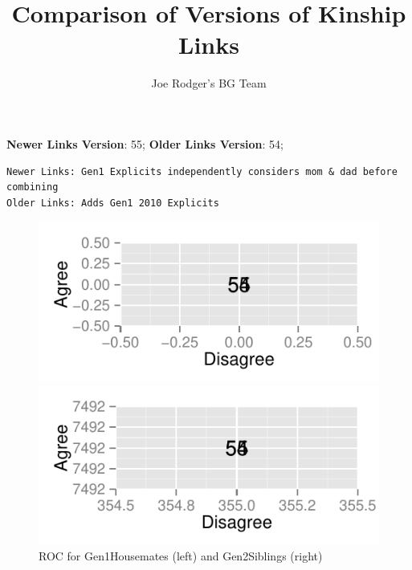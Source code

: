 \documentclass[a4paper]{article}\usepackage{graphicx, color}
\title{Comparison of Versions of Kinship Links}
\author{Joe Rodger's BG Team}
\makeatletter
\def\maxwidth{ %
  \ifdim\Gin@nat@width>\linewidth
    \linewidth
  \else
    \Gin@nat@width
  \fi
}
\newenvironment{kframe}{%
 \def\at@end@of@kframe{}%
 \ifinner\ifhmode%
  \def\at@end@of@kframe{\end{minipage}}%
  \begin{minipage}{\columnwidth}%
 \fi\fi%
 \def\FrameCommand##1{\hskip\@totalleftmargin \hskip-\fboxsep
 \colorbox{shadecolor}{##1}\hskip-\fboxsep
     \hskip-\linewidth \hskip-\@totalleftmargin \hskip\columnwidth}%
 \MakeFramed {\advance\hsize-\width
   \@totalleftmargin\z@ \linewidth\hsize
   \@setminipage}}%
 {\par\unskip\endMakeFramed%
 \at@end@of@kframe}
\newenvironment{knitrout}{}{} %
\makeatother
\begin{document}
\maketitle

\setlength{\parindent}{0pt}%







\textbf{Newer Links Version}: 55;
\textbf{Older Links Version}: 54;

\begin{knitrout}
\color{fgcolor}\begin{kframe}
\begin{verbatim}
Newer Links: Gen1 Explicits independently considers mom & dad before combining
Older Links: Adds Gen1 2010 Explicits
\end{verbatim}
\end{kframe}
\end{knitrout}


\begin{figure}[htbp]
\begin{knitrout}
\color{fgcolor}
\includegraphics[width=\maxwidth]{figure/unnamed-chunk-31} 

\includegraphics[width=\maxwidth]{figure/unnamed-chunk-32} 

\end{knitrout}

\caption{ROC for Gen1Housemates (left) and Gen2Siblings (right)}
\end{figure}
\end{document}
